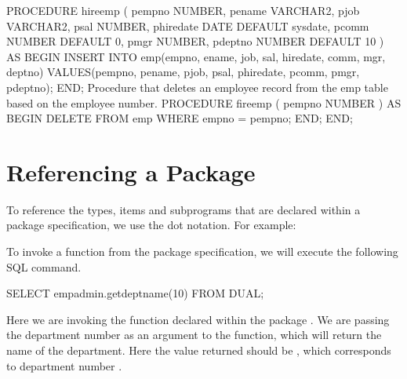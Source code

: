 \documentclass[letterpaper,10pt,english,openany,oneside]{sphinxmanual}
\begin{document}
\begin{sphinxVerbatim}[commandchars=\\\{\}]
    \PYGZhy{}\PYGZhy{}
       PROCEDURE hire\PYGZus{}emp (
       p\PYGZus{}empno            NUMBER,
       p\PYGZus{}ename            VARCHAR2,
       p\PYGZus{}job              VARCHAR2,
       p\PYGZus{}sal              NUMBER,
       p\PYGZus{}hiredate         DATE   DEFAULT sysdate,
       p\PYGZus{}comm             NUMBER DEFAULT 0,
       p\PYGZus{}mgr              NUMBER,
       p\PYGZus{}deptno           NUMBER DEFAULT 10
    )
    AS
    BEGIN
       INSERT INTO emp(empno, ename, job, sal, hiredate, comm, mgr, deptno)
          VALUES(p\PYGZus{}empno, p\PYGZus{}ename, p\PYGZus{}job, p\PYGZus{}sal,
                 p\PYGZus{}hiredate, p\PYGZus{}comm, p\PYGZus{}mgr, p\PYGZus{}deptno);
    END;
    \PYGZhy{}\PYGZhy{}
    \PYGZhy{}\PYGZhy{} Procedure that deletes an employee record from the \PYGZsq{}emp\PYGZsq{} table based
    \PYGZhy{}\PYGZhy{} on the employee number.
    \PYGZhy{}\PYGZhy{}
    PROCEDURE fire\PYGZus{}emp (
        p\PYGZus{}empno NUMBER
    )
    AS
    BEGIN
        DELETE FROM emp WHERE empno = p\PYGZus{}empno;
    END;
  END;
\end{sphinxVerbatim}

\newpage


\section{Referencing a Package}
\label{\detokenize{referencing_a_package:referencing-a-package}}\label{\detokenize{referencing_a_package::doc}}
To reference the types, items and subprograms that are declared within a
package specification, we use the dot notation. For example:




To invoke a function from the  package specification, we will
execute the following SQL command.

%
\begin{sphinxVerbatim}[commandchars=\\\{\}]
SELECT emp\PYGZus{}admin.get\PYGZus{}dept\PYGZus{}name(10) FROM DUAL;
\end{sphinxVerbatim}

Here we are invoking the  function declared within the
package . We are passing the department number as an argument
to the function, which will return the name of the department. Here the
value returned should be , which corresponds to department
number .
\end{document}
